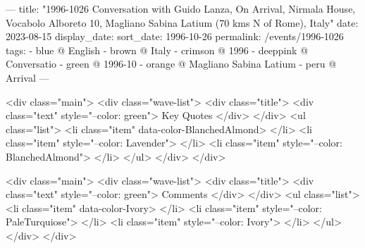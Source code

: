 ---
title: "1996-1026 Conversation with Guido Lanza, On Arrival, Nirmala House, Vocabolo Alboreto 10, Magliano Sabina Latium (70 kms N of Rome), Italy"
date: 2023-08-15
display_date: 
sort_date: 1996-10-26
permalink: /events/1996-1026
tags:
  - blue @ English
  - brown @ Italy
  - crimson @ 1996
  - deeppink @ Conversatio
  - green @ 1996-10
  - orange @ Magliano Sabina Latium
  - peru @ Arrival
---

<div class="main">
  <div class="wave-list">
    <div class="title">
      <div class="text" style="--color: green">
        Key Quotes
      </div>
    </div>
    <ul class="list">
        <li class="item" data-color-BlanchedAlmond>
        </li>
        <li class="item" style="--color: Lavender">
        </li>
        <li class="item" style="--color: BlanchedAlmond">
        </li>
      </ul>
  </div>
</div>

<div class="main">
  <div class="wave-list">
    <div class="title">
      <div class="text" style="--color: green">
        Comments
      </div>
    </div>
    <ul class="list">
        <li class="item" data-color-Ivory>
        </li>
        <li class="item" style="--color: PaleTurquiose">
        </li>
        <li class="item" style="--color: Ivory">
        </li>
      </ul>
  </div>
</div>